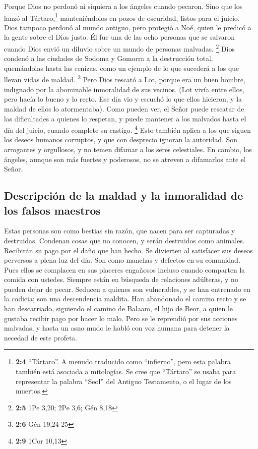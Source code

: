  Porque Dios no perdonó ni siquiera a los ángeles cuando
pecaron. Sino que los lanzó al Tártaro,\footnote{\textbf{2:4}
  ``Tártaro''. A menudo traducido como ``infierno'', pero esta palabra
  también está asociada a mitologías. Se cree que ``Tártaro'' se usaba
  para representar la palabra ``Seol'' del Antiguo Testamento, o el
  lugar de los muertos.} manteniéndolos en pozos de oscuridad, listos
para el juicio.  Dios tampoco perdonó al mundo antiguo,
pero protegió a Noé, quien le predicó a la gente sobre el Dios justo. Él
fue una de las ocho personas que se salvaron cuando Dios envió un
diluvio sobre un mundo de personas malvadas. \footnote{\textbf{2:5} 1Pe
  3,20; 2Pe 3,6; Gén 8,18}  Dios condenó a las ciudades de
Sodoma y Gomorra a la destrucción total, quemándolas hasta las cenizas,
como un ejemplo de lo que sucederá a los que llevan vidas de maldad.
\footnote{\textbf{2:6} Gén 19,24-25}  Pero Dios rescató a
Lot, porque era un buen hombre, indignado por la abominable inmoralidad
de sus vecinos.  (Lot vivía entre ellos, pero hacía lo
bueno y lo recto. Ese día vio y escuchó lo que ellos hicieron, y la
maldad de ellos lo atormentaba).  Como pueden ver, el
Señor puede rescatar de las dificultades a quienes lo respetan, y puede
mantener a los malvados hasta el día del juicio, cuando complete su
castigo. \footnote{\textbf{2:9} 1Cor 10,13}  Esto también
aplica a los que siguen los deseos humanos corruptos, y que con
desprecio ignoran la autoridad. Son arrogantes y orgullosos, y no temen
difamar a los seres celestiales.  En cambio, los ángeles,
aunque son más fuertes y poderosos, no se atreven a difamarlos ante el
Señor.

\hypertarget{descripciuxf3n-de-la-maldad-y-la-inmoralidad-de-los-falsos-maestros}{%
\subsection{Descripción de la maldad y la inmoralidad de los falsos
maestros}\label{descripciuxf3n-de-la-maldad-y-la-inmoralidad-de-los-falsos-maestros}}

 Estas personas son como bestias sin razón, que nacen
para ser capturadas y destruidas. Condenan cosas que no conocen, y serán
destruidos como animales.  Recibirán su pago por el daño
que han hecho. Se divierten al satisfacer sus deseos perversos a plena
luz del día. Son como manchas y defectos en su comunidad. Pues ellos se
complacen en sus placeres engañosos incluso cuando comparten la comida
con ustedes.  Siempre están en búsqueda de relaciones
adúlteras, y no pueden dejar de pecar. Seducen a quienes son
vulnerables, y se han entrenado en la codicia; son una descendencia
maldita.  Han abandonado el camino recto y se han
descarriado, siguiendo el camino de Balaam, el hijo de Beor, a quien le
gustaba recibir pago por hacer lo malo.  Pero se le
reprendió por sus acciones malvadas, y hasta un asno mudo le habló con
voz humana para detener la necedad de este profeta.

